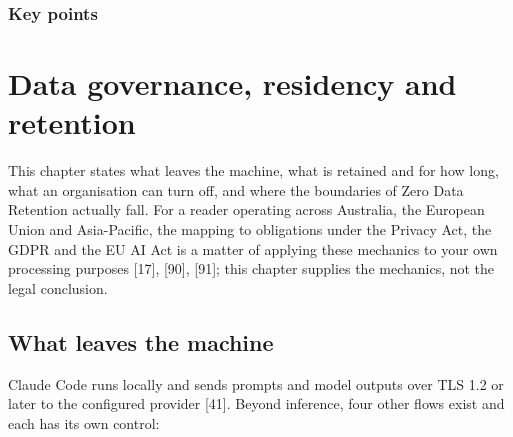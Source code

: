 \documentclass[11pt,a4paper,twoside,openany]{book}
\newcommand{\chaptertitlelabel}{}
\begin{document}
  \subsection*{Key points}
  \begin{itemize}\kprows\end{itemize}
\else
  \noindent\kpbody
\fi
\par\addvspace{1.4mm}
\endgroup

\FloatBarrier
\renewcommand{\chaptertitlelabel}{Part VIII \textperiodcentered\ Chapter 32}
\setcounter{chapter}{31}
\chapter{Data governance, residency and retention}

This chapter states what leaves the machine, what is retained and for how long, what an organisation can turn off, and where the boundaries of Zero Data Retention actually fall. For a reader operating across Australia, the European Union and Asia-Pacific, the mapping to obligations under the Privacy Act, the GDPR and the EU AI Act is a matter of applying these mechanics to your own processing purposes [17], [90], [91]; this chapter supplies the mechanics, not the legal conclusion.


\FloatBarrier
\setcounter{section}{0}
\section{What leaves the machine}

Claude Code runs locally and sends prompts and model outputs over TLS 1.2 or later to the configured provider [41]. Beyond inference, four other flows exist and each has its own control:
\end{document}
